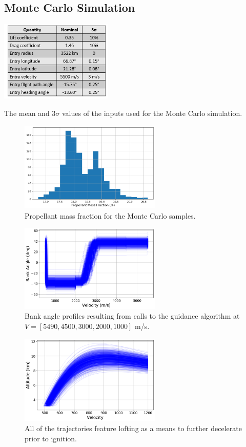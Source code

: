 \documentclass[letterpaper, paper,11pt]{AAS}
\begin{document}
\subsection{Monte Carlo Simulation}
\begin{table}[h!]
	\centering
	\includegraphics[width=0.4\textwidth]{DispersionTable} 
	\caption{The mean and $3\sigma$ values of the inputs used for the Monte Carlo simulation.}
	\label{table_input_dispersions}
\end{table}
\begin{figure}[h!]
	\centering
	\includegraphics[width=0.6\textwidth]{ignition_pmf} 
	\caption{Propellant mass fraction for the Monte Carlo samples.}
	\label{fig_mc_pmf}
\end{figure}
\begin{figure}[h!]
	\centering
	\includegraphics[width=0.6\textwidth]{bank_vel} 
	\caption{Bank angle profiles resulting from calls to the guidance algorithm at $ V=[5490, 4500, 3000, 2000, 1000] $ m/s.}
	\label{fig_mc_bank}
\end{figure}
\begin{figure}[h!]
	\centering
	\includegraphics[width=0.6\textwidth]{alt_vel_zoomed} 
	\caption{All of the trajectories feature lofting as a means to further decelerate prior to ignition.}
	\label{fig_mc_alt_vel}
\end{figure}
\end{document}
